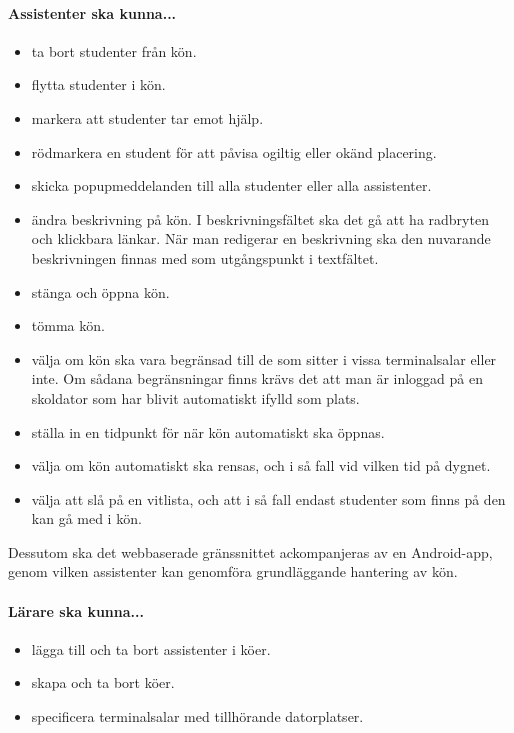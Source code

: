 \documentclass[a4paper]{article}
\begin{document}
	\paragraph{Assistenter ska kunna...}
	\begin{itemize}
		\item ta bort studenter från kön.
		\item flytta studenter i kön.
		\item markera att studenter tar emot hjälp.
		\item rödmarkera en student för att påvisa ogiltig eller okänd placering.
		\item skicka popupmeddelanden till alla studenter eller alla assistenter.
		\item ändra beskrivning på kön. I beskrivningsfältet ska det gå att ha radbryten och klickbara länkar. När man redigerar en beskrivning ska den nuvarande beskrivningen finnas med som utgångspunkt i textfältet.
		\item stänga och öppna kön.
		\item tömma kön.
		\item välja om kön ska vara begränsad till de som sitter i vissa terminalsalar eller inte. Om sådana begränsningar finns krävs det att man är inloggad på en skoldator som har blivit automatiskt ifylld som plats.
		\item ställa in en tidpunkt för när kön automatiskt ska öppnas.
		\item välja om kön automatiskt ska rensas, och i så fall vid vilken tid på dygnet.
		\item välja att slå på en vitlista, och att i så fall endast studenter som finns på den kan gå med i kön.
	\end{itemize}
	
	Dessutom ska det webbaserade gränssnittet ackompanjeras av en Android-app, genom vilken assistenter kan genomföra grundläggande hantering av kön.
	
	\paragraph{Lärare ska kunna...}
	\begin{itemize}
		\item lägga till och ta bort assistenter i köer.
		\item skapa och ta bort köer.
		\item specificera terminalsalar med tillhörande datorplatser.
	\end{itemize}
\end{document}
